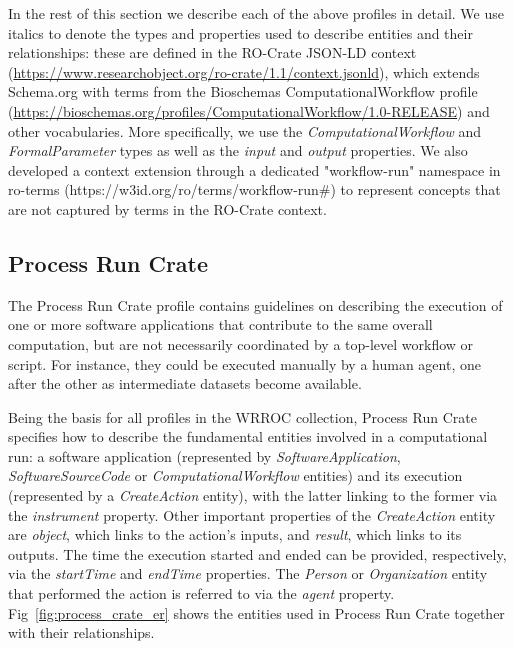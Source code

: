 \documentclass[10pt,letterpaper]{article}
\begin{document}
In the rest of this section we describe each of the above profiles in detail.
We use italics to denote the types and properties used to describe entities and their relationships: these are defined in the RO-Crate JSON-LD context (\url{https://www.researchobject.org/ro-crate/1.1/context.jsonld}), which extends Schema.org with terms from the Bioschemas \cite{Gray 2017} ComputationalWorkflow profile (\url{https://bioschemas.org/profiles/ComputationalWorkflow/1.0-RELEASE}) and other vocabularies. More specifically, we use the \emph{ComputationalWorkflow} and \emph{FormalParameter} types as well as the \emph{input} and \emph{output} properties. We also developed a context extension through a dedicated "workflow-run" namespace in ro-terms (https://w3id.org/ro/terms/workflow-run\#) to represent concepts that are not captured by terms in the RO-Crate context.

\subsection{Process Run Crate}\label{process-run-crate}

The Process Run Crate profile contains guidelines on describing the execution of one or more software applications that contribute to the same overall computation, but are not necessarily coordinated by a top-level workflow or script.
For instance, they could be executed manually by a human agent, one after the other as intermediate datasets become available.

Being the basis for all profiles in the WRROC collection, Process Run Crate specifies how to describe the fundamental entities involved in a computational run: a software application (represented by
\emph{SoftwareApplication}, \emph{SoftwareSourceCode} or
\emph{ComputationalWorkflow} entities) and its execution (represented by a \emph{CreateAction} entity), with the latter linking to the former via the \emph{instrument} property.
Other important properties of the
\emph{CreateAction} entity are \emph{object}, which links to the action's inputs, and \emph{result}, which links to its outputs.
The time the execution started and ended can be provided, respectively, via the
\emph{startTime} and \emph{endTime} properties.
The \emph{Person} or
\emph{Organization} entity that performed the action is referred to via the \emph{agent} property.
Fig~\ref{fig:process_crate_er} shows the entities used in Process Run Crate together with their relationships.
\end{document}
